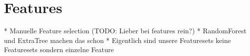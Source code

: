 \section{Features}

* Manuelle Feature selection (TODO: Lieber bei features rein?)
* RandomForest und ExtraTree machen das schon
* Eigentlich sind unsere Featuresets keine Featuresets sondern einzelne Feature






